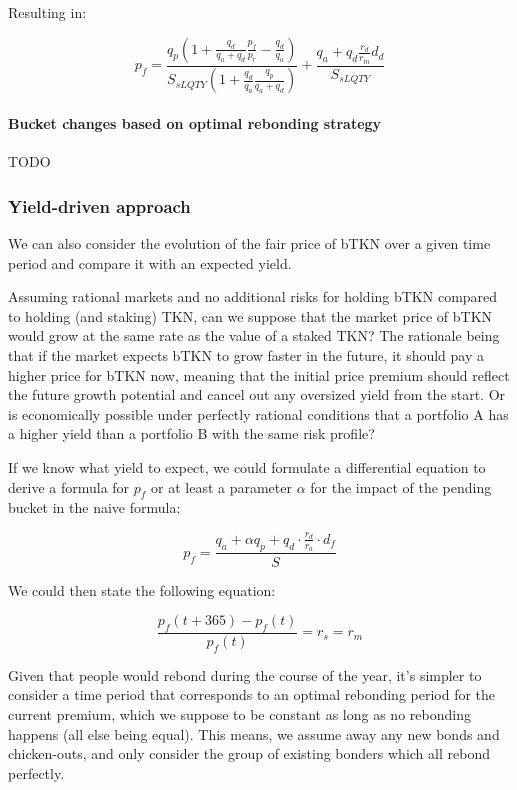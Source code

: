 \documentclass{article}
\begin{document}
Resulting in:

\begin{equation}
p_{f} = \frac{q_{p} \left(1+\frac{q_{d}}{q_{a}+q_{d}} \frac{p_{f}}{p_{r}}-\frac{q_{d}}{q_{a}}\right)}{S_{sLQTY} \left( 1+\frac{q_{d}}{q_{a}}\frac{q_{p}}{q_{a}+q_{d}} \right)} + \frac{q_{a}+q_{d}\frac{r_{d}}{r_{m}}d_{d}}{S_{sLQTY}}
\end{equation}

\paragraph{Bucket changes based on optimal rebonding strategy}
TODO

\subsubsection{Yield-driven approach}
We can also consider the evolution of the fair price of bTKN over a given time period and compare it with an expected yield. 

Assuming rational markets and no additional risks for holding bTKN compared to holding (and staking) TKN, can we suppose that the market price of bTKN would grow at the same rate as the value of a staked TKN? The rationale being that if the market expects bTKN to grow faster in the future, it should pay a higher price for bTKN now, meaning that the initial price premium should reflect the future growth potential and cancel out any oversized yield from the start. Or is economically possible under perfectly rational conditions that a portfolio A has a higher yield than a portfolio B with the same risk profile?

If we know what yield to expect, we could formulate a differential equation to derive a formula for $p_f$ or at least a parameter $\alpha$ for the impact of the pending bucket in the naive formula:

\begin{equation}
  \label{eq:naive-beta}
   p_f = \frac{q_a + \alpha q_p + q_d \cdot \frac{r_d}{r_a} \cdot d_f}{S}
\end{equation}

We could then state the following equation:

\begin{equation}
  \label{eq:yield-eq}
  \frac{p_f(t + 365) - p_f(t)}{p_f(t)} = r_s = r_m 
\end{equation}

Given that people would rebond during the course of the year, it’s simpler to consider a time period that corresponds to an optimal rebonding period for the current premium, which we suppose to be constant as long as no rebonding happens (all else being equal). This means, we assume away any new bonds and chicken-outs, and only consider the group of existing bonders which all rebond perfectly.
\end{document}
